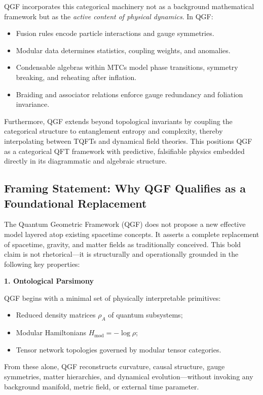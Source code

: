 \documentclass[11pt]{article}
\begin{document}
QGF incorporates this categorical machinery not as a background mathematical framework but as the \emph{active content of physical dynamics}. In QGF:
\begin{itemize}
  \item Fusion rules encode particle interactions and gauge symmetries.
  \item Modular data determines statistics, coupling weights, and anomalies.
  \item Condensable algebras within MTCs model phase transitions, symmetry breaking, and reheating after inflation.
  \item Braiding and associator relations enforce gauge redundancy and foliation invariance.
\end{itemize}

Furthermore, QGF extends beyond topological invariants by coupling the categorical structure to entanglement entropy and complexity, thereby interpolating between TQFTs and dynamical field theories. This positions QGF as a categorical QFT framework with predictive, falsifiable physics embedded directly in its diagrammatic and algebraic structure.

\subsection{Framing Statement: Why QGF Qualifies as a Foundational Replacement}

The Quantum Geometric Framework (QGF) does not propose a new effective model layered atop existing spacetime concepts. It asserts a complete replacement of spacetime, gravity, and matter fields as traditionally conceived. This bold claim is not rhetorical—it is structurally and operationally grounded in the following key properties:

\vspace{0.5em}
\noindent\textbf{1. Ontological Parsimony}

QGF begins with a minimal set of physically interpretable primitives:

\begin{itemize}
  \item Reduced density matrices \( \rho_A \) of quantum subsystems;
  \item Modular Hamiltonians \( H_{\text{mod}} = -\log \rho \);
  \item Tensor network topologies governed by modular tensor categories.
\end{itemize}

From these alone, QGF reconstructs curvature, causal structure, gauge symmetries, matter hierarchies, and dynamical evolution—without invoking any background manifold, metric field, or external time parameter.
\end{document}
